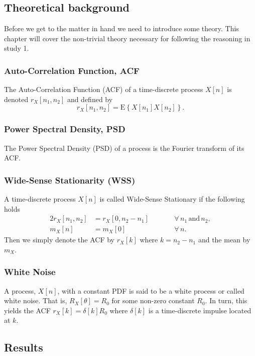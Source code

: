 \documentclass[10pt]{article}
\begin{document}
\subsection{Theoretical background}
Before we get to the matter in hand we need to introduce some theory. This chapter will cover the non-trivial theory necessary for following the reasoning in study 1. 

\subsubsection{Auto-Correlation Function, ACF}
The Auto-Correlation Function (ACF) of a time-discrete process $X[n]$ is denoted $r_X[n_1,n_2]$ and defined by
\begin{equation*}
  r_X[n_1,n_2] = \text{E}\left\{X[n_1]X[n_2]\right\}.
\end{equation*}

\subsubsection{Power Spectral Density, PSD}
The Power Spectral Density (PSD) of a process is the Fourier transform of its ACF. 

\subsubsection{Wide-Sense Stationarity (WSS)}
A time-discrete process $X[n]$ is called Wide-Sense Stationary if the following holds
\begin{alignat*}{2}
  r_X[n_1,n_2] &= r_X[0,n_2-n_1] \qquad &&\forall \, n_1\, \text{and}\, n_2, \\
  m_X[n] &= m_X[0] &&\forall \,n.
\end{alignat*}
Then we simply denote the ACF by $r_X[k]$ where $k=n_2-n_1$ and the mean by $m_X$.

\subsubsection{White Noise}
A process, $X[n]$, with a constant PDF is said to be a white process or called white noise. That is, $R_X[\theta] = R_0$ for some non-zero constant $R_0$. In turn, this yields the ACF $r_X[k] = \delta[k] R_0$ where $\delta[k]$ is a time-discrete impulse located at $k$. 



\subsection{Results}
\end{document}
